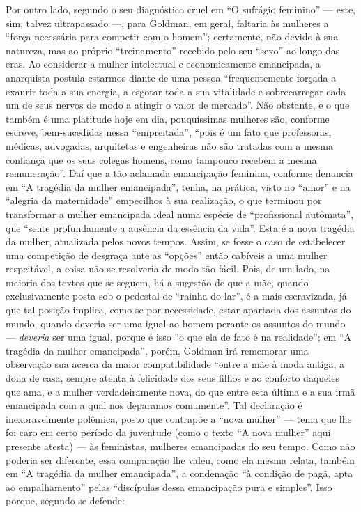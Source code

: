 Por outro lado, segundo o seu diagnóstico cruel em ``O sufrágio
feminino'' --- este, sim, talvez ultrapassado ---, para Goldman, em geral,
faltaria às mulheres a ``força necessária para competir com o homem'';
certamente, não devido à sua natureza, mas ao próprio ``treinamento''
recebido pelo seu ``sexo'' ao longo das eras. Ao considerar a mulher
intelectual e economicamente emancipada, a anarquista postula estarmos
diante de uma pessoa ``frequentemente forçada a exaurir toda a sua
energia, a esgotar toda a sua vitalidade e sobrecarregar cada um de seus
nervos de modo a atingir o valor de mercado''. Não obstante, e o que
também é uma platitude hoje em dia, pouquíssimas mulheres são, conforme
escreve, bem-sucedidas nessa ``empreitada'', ``pois é um fato que
professoras, médicas, advogadas, arquitetas e engenheiras não são
tratadas com a mesma confiança que os seus colegas homens, como tampouco
recebem a mesma remuneração''. Daí que a tão aclamada emancipação
feminina, conforme denuncia em ``A tragédia da mulher emancipada'',
tenha, na prática, visto no ``amor'' e na ``alegria da maternidade''
empecilhos à sua realização, o que terminou por transformar a mulher
emancipada ideal numa espécie de ``profissional autômata'', que ``sente
profundamente a ausência da essência da vida''. Esta é a nova tragédia
da mulher, atualizada pelos novos tempos. Assim, se fosse o caso de
estabelecer uma competição de desgraça ante as ``opções'' então cabíveis
a uma mulher respeitável, a coisa não se resolveria de modo tão fácil.
Pois, de um lado, na maioria dos textos que se seguem, há a sugestão de
que a mãe, quando exclusivamente posta sob o pedestal de ``rainha do
lar'', é a mais escravizada, já que tal posição implica, como se por
necessidade, estar apartada dos assuntos do mundo, quando deveria ser
uma igual ao homem perante os assuntos do mundo --- \emph{deveria} ser
uma igual, porque é isso ``o que ela de fato é na realidade''; em ``A
tragédia da mulher emancipada'', porém, Goldman irá rememorar uma
observação sua acerca da maior compatibilidade ``entre a mãe à moda
antiga, a dona de casa, sempre atenta à felicidade dos seus filhos e ao
conforto daqueles que ama, e a mulher verdadeiramente nova, do que entre
esta última e a sua irmã emancipada com a qual nos deparamos
comumente''. Tal declaração é inexoravelmente polêmica, posto que
contrapõe a ``nova mulher'' --- tema que lhe foi caro em certo período da
juventude (como o texto ``A nova mulher'' aqui presente atesta) --- às
feministas, mulheres emancipadas do seu tempo. Como não poderia ser
diferente, essa comparação lhe valeu, como ela mesma relata, também em
``A tragédia da mulher emancipada'', a condenação ``à condição de pagã,
apta ao empalhamento'' pelas ``discípulas dessa emancipação pura e
simples''. Isso porque, segundo se defende:

